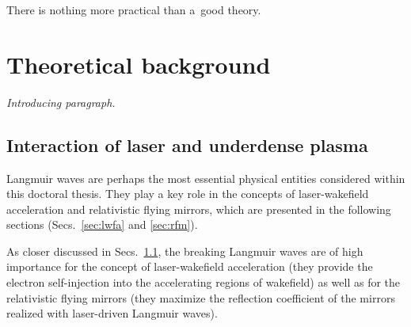 \documentclass[10pt, a4paper, twoside, openright]{report}
\begin{document}

\begin{savequote}[0.45\linewidth]
	\begin{fquote}
		 There is nothing more practical than a~good theory.
	\end{fquote}
\end{savequote}

\chapter{Theoretical background\label{chap:theoretical_background}}

\noindent \textsl{Introducing paragraph.}

\section{Interaction of laser and underdense plasma}

Langmuir waves are perhaps the most essential physical entities considered within this doctoral thesis. They play a key role in the concepts of laser-wakefield acceleration and relativistic flying mirrors, which are presented in the following sections (Secs.~\ref{sec:lwfa} and \ref{sec:rfm}). 

As closer discussed in Secs.~\ref{}, the breaking Langmuir waves are of high importance for the concept of laser-wakefield acceleration (they provide the electron self-injection into the accelerating regions of wakefield) as well as for the relativistic flying mirrors (they maximize the reflection coefficient of the mirrors realized with laser-driven Langmuir waves). 

%

%

%

%
\end{document}
